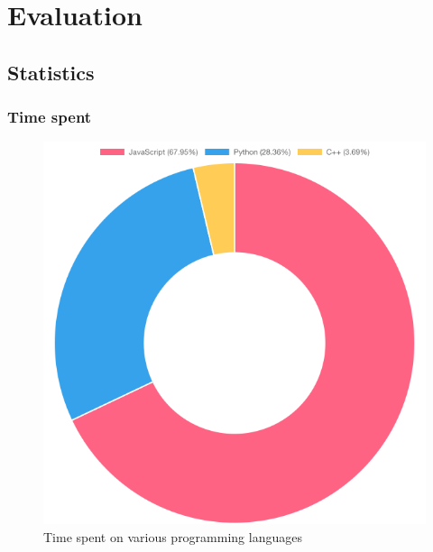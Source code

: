 \chapter{Evaluation}

\section{Statistics}

\subsection{Time spent}

\begin{figure}[h]
\centering
\includegraphics[scale=0.5]{04_Artefakte/01_Abbildungen/time-spent-on-languages}
\caption[Time spent on languages]{Time spent on various programming languages\protect}
\label{fig:timeSpentLanguages}
\end{figure}

